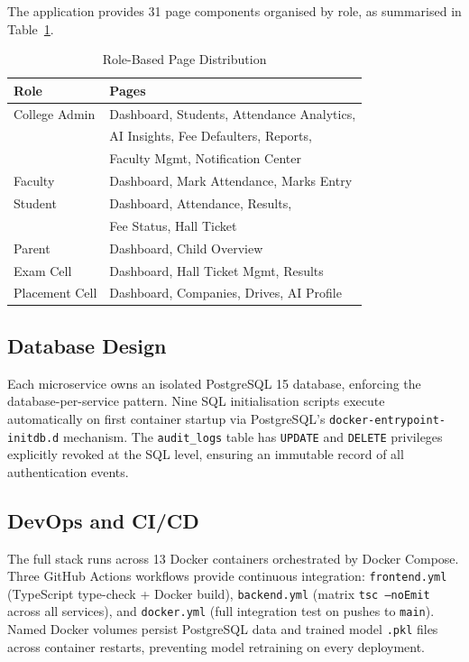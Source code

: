 \documentclass[conference]{IEEEtran}
\begin{document}
The application provides 31 page components organised by role, as summarised in
Table~\ref{tab:pages}.

\begin{table}[htbp]
\caption{Role-Based Page Distribution}
\label{tab:pages}
\centering
\begin{tabular}{ll}
\toprule
\textbf{Role} & \textbf{Pages} \\
\midrule
College Admin & Dashboard, Students, Attendance Analytics, \\
              & AI Insights, Fee Defaulters, Reports, \\
              & Faculty Mgmt, Notification Center \\
Faculty       & Dashboard, Mark Attendance, Marks Entry \\
Student       & Dashboard, Attendance, Results, \\
              & Fee Status, Hall Ticket \\
Parent        & Dashboard, Child Overview \\
Exam Cell     & Dashboard, Hall Ticket Mgmt, Results \\
Placement Cell& Dashboard, Companies, Drives, AI Profile \\
\bottomrule
\end{tabular}
\end{table}

\subsection{Database Design}

Each microservice owns an isolated PostgreSQL 15 database, enforcing the
database-per-service pattern. Nine SQL initialisation scripts execute
automatically on first container startup via PostgreSQL's
\texttt{docker-entrypoint-initdb.d} mechanism. The \texttt{audit\_logs} table
has \texttt{UPDATE} and \texttt{DELETE} privileges explicitly revoked at the SQL
level, ensuring an immutable record of all authentication events.

\subsection{DevOps and CI/CD}

The full stack runs across 13 Docker containers orchestrated by Docker Compose.
Three GitHub Actions workflows provide continuous integration:
\texttt{frontend.yml} (TypeScript type-check + Docker build),
\texttt{backend.yml} (matrix \texttt{tsc --noEmit} across all services), and
\texttt{docker.yml} (full integration test on pushes to \texttt{main}). Named
Docker volumes persist PostgreSQL data and trained model \texttt{.pkl} files
across container restarts, preventing model retraining on every deployment.
\end{document}

